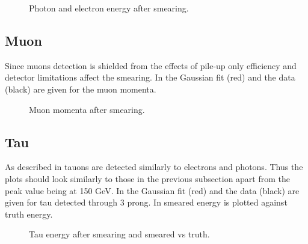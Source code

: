
 \begin{figure}[H] %
    \hfill
{}
    \hfill
    \hfill
{}
    \caption{Photon and electron energy after smearing.}
    \label{fig:elph}
\end{figure}
\newpage
\subsection{Muon}
Since muons detection is shielded from the effects of pile-up only efficiency and detector limitations affect the smearing. In  the Gaussian fit (red) and the data (black) are given for the muon momenta.
 \begin{figure}[H] %
    \hfill
    \caption{Muon momenta after smearing.}
    \label{fig:muon}
  \end{figure}
\subsection{Tau}
As described in  tauons are detected similarly to electrons and photons. Thus the plots should look similarly to those in the previous subsection apart from the peak value being at 150 GeV. In  the Gaussian fit (red) and the data (black) are given for tau detected through 3 prong. In  smeared energy is plotted against truth energy. 
 \begin{figure}[H] %
    \hfill
    \caption{Tau energy after smearing and smeared vs truth.}
    \label{fig:tau}
  \end{figure}
  \newpage
